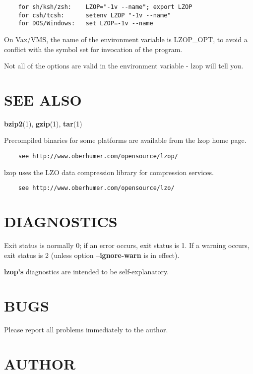 \begin{verbatim}
    for sh/ksh/zsh:    LZOP="-1v --name"; export LZOP
    for csh/tcsh:      setenv LZOP "-1v --name"
    for DOS/Windows:   set LZOP=-1v --name
\end{verbatim}


On Vax/VMS, the name of the environment variable is
LZOP\_OPT, to avoid a conflict with the symbol set for
invocation of the program.



Not all of the options are valid in the environment variable -
lzop will tell you.

\section{SEE ALSO\label{SEE_ALSO}}


\textbf{bzip2}(1), \textbf{gzip}(1), \textbf{tar}(1)



Precompiled binaries for some platforms are available
from the lzop home page.

\begin{verbatim}
    see http://www.oberhumer.com/opensource/lzop/
\end{verbatim}


lzop uses the LZO data compression library for compression
services.

\begin{verbatim}
    see http://www.oberhumer.com/opensource/lzo/
\end{verbatim}
\section{DIAGNOSTICS\label{DIAGNOSTICS}}


Exit status is normally 0; if an error occurs, exit status
is 1. If a warning occurs, exit status is 2 (unless
option \textbf{--ignore-warn} is in effect).



\textbf{lzop's} diagnostics are intended to be self-explanatory.

\section{BUGS\label{BUGS}}


Please report all problems immediately to the author.

\section{AUTHOR\label{AUTHOR}}


